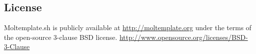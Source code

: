 \documentclass[11pt]{article}
\begin{document}
\subsection*{License}
Moltemplate.sh is publicly available at \url{http://moltemplate.org} 
under the terms of the open-source 3-clause BSD license.
\url{http://www.opensource.org/licenses/BSD-3-Clause}







\end{document}
